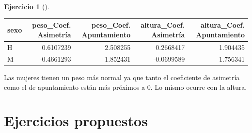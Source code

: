 \documentclass[
  a4paper,
]{scrreport}
\theoremstyle{definition}
\newtheorem{exercise}{Ejercicio}[chapter]
\theoremstyle{remark}
\begin{document}
\begin{exercise}[]
\begin{enumerate}
\begin{tcolorbox}
  \begin{longtable*}[t]{lrrrr}
  \toprule
  sexo & peso\_Coef. Asimetría & peso\_Coef. Apuntamiento & altura\_Coef. Asimetría & altura\_Coef. Apuntamiento\\
  \midrule
  H & 0.6107239 & 2.508255 & 0.2668417 & 1.904435\\
  M & -0.4661293 & 1.852431 & -0.0699589 & 1.756341\\
  \bottomrule
  \end{longtable*}

  Las mujeres tienen un peso más normal ya que tanto el coeficiente de
  asimetría como el de apuntamiento están más próximos a 0. Lo mismo
  ocurre con la altura.

  \end{tcolorbox}
\end{enumerate}

\end{exercise}

\section{Ejercicios propuestos}\label{ejercicios-propuestos-3}
\end{document}
